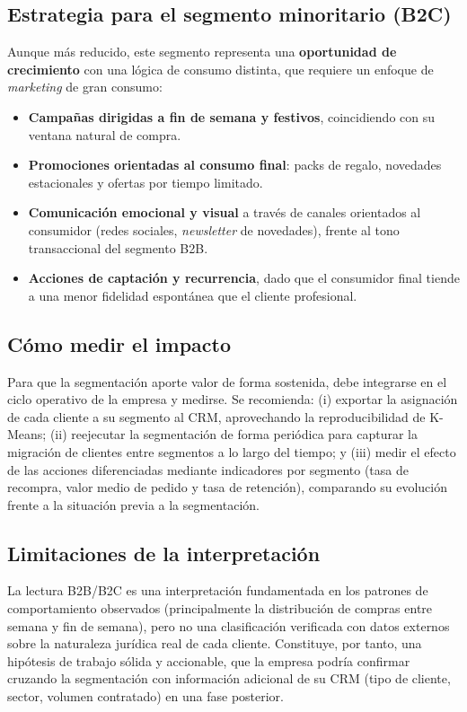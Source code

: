 \documentclass[11pt,a4paper]{article}
\begin{document}
\subsection{Estrategia para el segmento minoritario (B2C)}

Aunque más reducido, este segmento representa una \textbf{oportunidad de crecimiento} con una lógica de consumo distinta, que requiere un enfoque de \textit{marketing} de gran consumo:

\begin{itemize}
    \item \textbf{Campañas dirigidas a fin de semana y festivos}, coincidiendo con su ventana natural de compra.
    \item \textbf{Promociones orientadas al consumo final}: packs de regalo, novedades estacionales y ofertas por tiempo limitado.
    \item \textbf{Comunicación emocional y visual} a través de canales orientados al consumidor (redes sociales, \textit{newsletter} de novedades), frente al tono transaccional del segmento B2B.
    \item \textbf{Acciones de captación y recurrencia}, dado que el consumidor final tiende a una menor fidelidad espontánea que el cliente profesional.
\end{itemize}

\subsection{Cómo medir el impacto}

Para que la segmentación aporte valor de forma sostenida, debe integrarse en el ciclo operativo de la empresa y medirse. Se recomienda: (i) exportar la asignación de cada cliente a su segmento al CRM, aprovechando la reproducibilidad de K-Means; (ii) reejecutar la segmentación de forma periódica para capturar la migración de clientes entre segmentos a lo largo del tiempo; y (iii) medir el efecto de las acciones diferenciadas mediante indicadores por segmento (tasa de recompra, valor medio de pedido y tasa de retención), comparando su evolución frente a la situación previa a la segmentación.

\subsection{Limitaciones de la interpretación}

La lectura B2B/B2C es una interpretación fundamentada en los patrones de comportamiento observados (principalmente la distribución de compras entre semana y fin de semana), pero no una clasificación verificada con datos externos sobre la naturaleza jurídica real de cada cliente. Constituye, por tanto, una hipótesis de trabajo sólida y accionable, que la empresa podría confirmar cruzando la segmentación con información adicional de su CRM (tipo de cliente, sector, volumen contratado) en una fase posterior.
\end{document}
